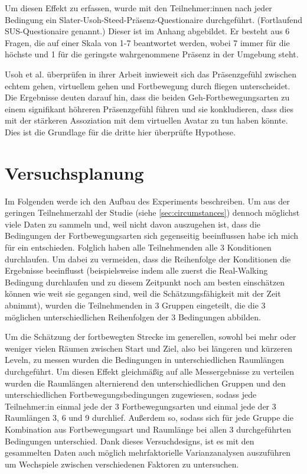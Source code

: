             Um diesen Effekt zu erfassen, wurde mit den Teilnehmer:innen nach jeder Bedingung ein Slater-Usoh-Steed-Präsenz-Questionaire \cite{presence-questionaire} durchgeführt. (Fortlaufend SUS-Questionaire genannt.) Dieser ist im Anhang %
            abgebildet. Er besteht aus 6 Fragen, die auf einer Skala von 1-7 beantwortet werden, wobei 7 immer für die höchste und 1 für die geringste wahrgenommene Präsenz in der Umgebung steht.

            Usoh et al. überprüfen in ihrer Arbeit \cite{usoh-vergleich-1999} inwieweit sich das Präsenzgefühl zwischen echtem gehen, virtuellem gehen und Fortbewegung durch fliegen unterscheidet. Die Ergebnisse deuten darauf hin, dass die beiden Geh-Fortbewegungsarten zu einem signifikant höhreren Präsenzgefühl führen und sie konkludieren, dass dies mit der stärkeren Assoziation mit dem virtuellen Avatar zu tun haben könnte. Dies ist die Grundlage für die dritte hier überprüfte Hypothese.



    \section{Versuchsplanung}\label{sec:setup}
    Im Folgenden werde ich den Aufbau des Experiments beschreiben.
    Um aus der geringen Teilnehmerzahl der Studie (siehe \autoref{sec:circumstances})
    dennoch möglichst viele Daten zu sammeln und, weil nicht davon auszugehen ist, dass die Bedingungen der Fortbewegungsarten sich gegenseitig beeinflussen habe ich mich für ein  entschieden. Folglich haben alle Teilnehmenden alle 3 Konditionen durchlaufen. Um dabei zu vermeiden, dass die Reihenfolge der Konditionen die Ergebnisse beeinflusst (beispielsweise indem alle zuerst die Real-Walking Bedingung durchlaufen und zu diesem Zeitpunkt noch am besten einschätzen können wie weit sie gegangen sind, weil die Schätzungsfähigkeit mit der Zeit abnimmt), wurden die Teilnehmenden in 3 Gruppen eingeteilt, die die 3 möglichen unterschiedlichen Reihenfolgen der 3 Bedingungen abbilden.

    Um die Schätzung der fortbewegten Strecke im generellen, sowohl bei mehr oder weniger vielen Räumen zwischen Start und Ziel, also bei längeren und kürzeren Leveln, zu messen wurden die Bedingungen in unterschiedlichen Raumlängen durchgeführt. Um diesen Effekt gleichmäßig auf alle Messergebnisse zu verteilen wurden die Raumlängen alternierend den unterschiedlichen Gruppen und den unterschiedlichen Fortbewegungsbedingungen zugewiesen, sodass jede Teilnehmer:in einmal jede der 3 Fortbewegungsarten und einmal jede der 3 Raumlängen 3, 6 und 9 durchlief. Außerdem so, sodass sich für jede Gruppe die Kombination aus Fortbewegungsart und Raumlänge bei allen 3 durchgeführten Bedingungen unterschied. Dank dieses Versuchdesigns, ist es mit den gesammelten Daten auch möglich mehrfaktorielle Varianzanalysen auszuführen um Wechspiele zwischen verschiedenen Faktoren zu untersuchen.

